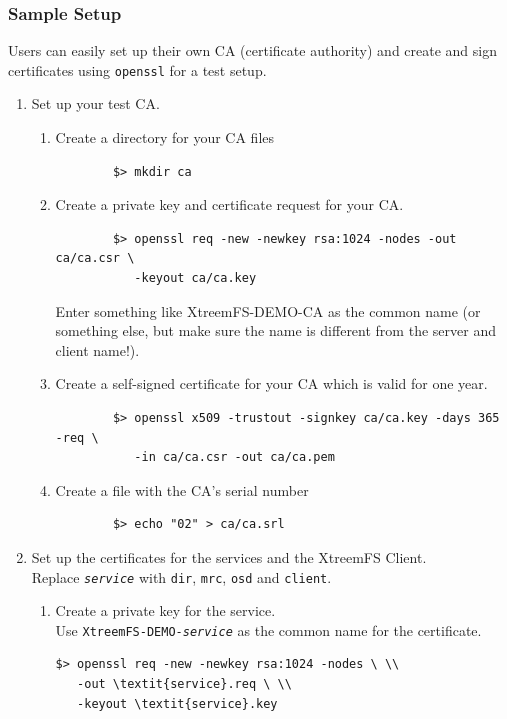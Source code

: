 \documentclass[a4paper,10pt]{book}
\begin{document}
\subsubsection{Sample Setup}

Users can easily set up their own CA (certificate authority) and create and sign certificates using \texttt{openssl} for a test setup.

\begin{enumerate}
 \item Set up your test CA.
	\begin{enumerate}
	\item Create a directory for your CA files
		\begin{verbatim}
		$> mkdir ca
		\end{verbatim}

	\item Create a private key and certificate request for your CA.
		\begin{verbatim}
		$> openssl req -new -newkey rsa:1024 -nodes -out ca/ca.csr \
		   -keyout ca/ca.key
		\end{verbatim}

		Enter something like XtreemFS-DEMO-CA as the common name (or something else, but make sure the name is different from the server and client name!).
	\item Create a self-signed certificate for your CA which is valid for one year.
		\begin{verbatim}
		$> openssl x509 -trustout -signkey ca/ca.key -days 365 -req \
		   -in ca/ca.csr -out ca/ca.pem
		\end{verbatim}

	\item Create a file with the CA's serial number
		\begin{verbatim}
		$> echo "02" > ca/ca.srl
		\end{verbatim}

 \end{enumerate}
 \item Set up the certificates for the services and the XtreemFS Client.\\
	Replace \texttt{\textit{service}} with \texttt{dir}, \texttt{mrc}, \texttt{osd} and \texttt{client}.
	\begin{enumerate}
	\item Create a private key for the service.\\
	      Use \texttt{XtreemFS-DEMO-\textit{service}} as the common name for the certificate.
		\begin{Verbatim}[commandchars=\\\{\}]
$> openssl req -new -newkey rsa:1024 -nodes \ \\
   -out \textit{service}.req \ \\
   -keyout \textit{service}.key
		\end{Verbatim}


\end{enumerate}
\end{enumerate}
\end{document}
